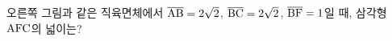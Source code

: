 \noindent\begin{minipage}[t]{0.58\linewidth}\vspace{0pt}\raggedright 오른쪽 그림과 같은 직육면체에서 $\overline{\mathrm{AB}}=2\sqrt{2}$, $\overline{\mathrm{BC}}=2\sqrt{2}$, $\overline{\mathrm{BF}}=1$일 때, 삼각형~$\mathrm{AFC}$의 넓이는?\end{minipage}\hfill\begin{minipage}[t]{0.4\linewidth}\vspace{0pt}\centering \resizebox{\ifdim\width>\linewidth\linewidth\else\width\fi}{!}{}\end{minipage}\par
{}
